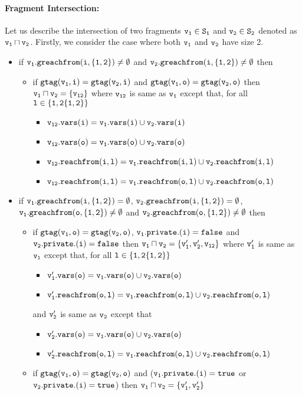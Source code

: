 \paragraph{Fragment Intersection:} Let us describe the intersection of two fragments $\tt v_1 \in S_1$ and $\tt v_2 \in S_2$ denoted as $\tt v_1 \sqcap v_2$. Firstly, we consider the case where both $\tt v_1$ and $\tt v_2$ have size 2.
 \begin{itemize}
 \item if $\tt v_1.greachfrom(i,\{1,2\}) \neq \emptyset$ and $\tt v_2.greachfrom(i,\{1,2\}) \neq \emptyset$ then 
  \begin{itemize}
  \item if $\tt gtag(v_1, i) = gtag(v_2, i)$ and $\tt gtag(v_1, o) = gtag(v_2, o)$ then $\tt v_1 \sqcap v_2 = \{v_{12}\}$ where $\tt v_{12}$ is same as $\tt v_1$ except that, for all $\tt l \in \{1,2 \{1,2\}\}$ 
  \begin{itemize}
  \item $\tt v_{12}.vars(i) = v_1.vars(i) \cup v_2.vars(i)$ 
  \item  $\tt v_{12}.vars(o) = v_1.vars(o) \cup v_2.vars(o)$
  \item $\tt v_{12}.reachfrom(i,l) = v_{1}.reachfrom(i,l) \cup v_{2}.reachfrom(i,l)$
   \item $\tt v_{12}.reachfrom(i,l) = v_{1}.reachfrom(o,l) \cup v_{2}.reachfrom(o,l)$
    \end{itemize}
 \end{itemize}

 \item if $\tt v_1.greachfrom(i,\{1,2\}) = \emptyset$, $\tt v_2.greachfrom(i,\{1,2\}) = \emptyset$, $\tt v_1.greachfrom(o,\{1,2\}) \neq \emptyset$ and $\tt v_2.greachfrom(o,\{1,2\}) \neq \emptyset$ then 
  \begin{itemize}
  \item if $\tt gtag(v_1, o) = gtag(v_2, o)$, $\tt v_1.private.(i) = false$ and $\tt v_2.private.(i) = false$ then $\tt v_1 \sqcap v_2 = \{v_1', v_2', v_{12}\}$ where %
  $\tt v_1'$ is same as $\tt v_1$ except that, for all $\tt l \in \{1,2 \{1,2\}\}$
    \begin{itemize}
  \item  $\tt v_1'.vars(o) = v_1.vars(o) \cup v_2.vars(o)$
  \item $\tt v_1'.reachfrom(o,l) = v_{1}.reachfrom(o,l) \cup v_{2}.reachfrom(o,l)$
    \end{itemize}
   and $\tt v_2'$ is same as $\tt v_2$ except that 
    \begin{itemize}
  \item  $\tt v_2'.vars(o) = v_1.vars(o) \cup v_2.vars(o)$
  \item $\tt v_2'.reachfrom(o,l) = v_{1}.reachfrom(o,l) \cup v_{2}.reachfrom(o,l)$
    \end{itemize}
     \item if $\tt gtag(v_1, o) = gtag(v_2, o)$ and ($\tt v_1.private.(i) = true$ or $\tt v_2.private.(i) = true$) then $\tt v_1 \sqcap v_2 = \{v_1', v_2'\}$ 
 \end{itemize}
 

\end{itemize}

